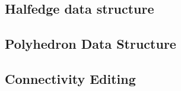 \subsection{Halfedge data structure}


\subsection{Polyhedron Data Structure}
\label{sec:polyhedron}


\subsection{Connectivity Editing}

